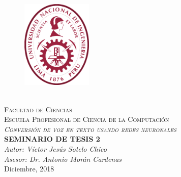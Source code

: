 \documentclass[12pt,spanish, singlespacing,]{MastersDoctoralThesis}
\author{}
\newcommand\blankpage{%
    \null
    \thispagestyle{empty}%
    \addtocounter{page}{0}%
    \newpage}
\begin{document}
\frontmatter 
\pagestyle{plain} 
\begin{titlepage}
\begin{center}

\begin{figure}[h]
\centering
\includegraphics[width=0.3\textwidth]{Figures/log_uni.png}
\end{figure}

\textsc{\huge \univname}\\[0.3cm]
\textsc{\Large Facultad de Ciencias}\\[0.2cm]
\textsc{\large Escuela Profesional de Ciencia de la Computaci\'on}\\[2cm]
\textsc{\LARGE \textit{Conversión de voz en texto usando redes neuronales}}\\[2cm] 
{\Large \textbf{SEMINARIO DE TESIS 2}}
{\huge \bfseries \ttitle}\\[2cm] 

\bigskip
\bigskip
\large\emph{Autor: Víctor Jesús Sotelo Chico}
{\authorname}\\ 
\large\emph{Asesor: Dr. Antonio Morán Cardenas}
{\supname} 
\\[1cm]
{\large Diciembre, 2018}\\[4cm] 
 
\vfill
\end{center}
\end{titlepage}
\afterpage{\blankpage}
\end{document}
